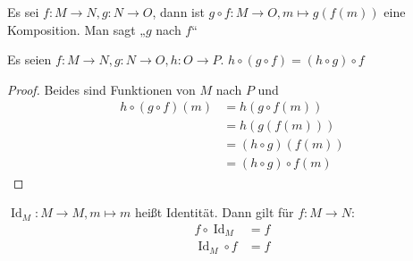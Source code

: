 \begin{definition}
  Es sei $f: M \to N, g: N \to O$, dann ist $g \circ f: M \to O, m \mapsto g(f(m))$ eine Komposition\index[sym]{$\circ$}. Man sagt „$g$ nach $f$“
\end{definition}
\begin{lemma}
  Es seien $f: M \to N, g: N \to O, h: O \to P$. $h \circ (g \circ f) = (h \circ g) \circ f$
\end{lemma}
\begin{proof}
  Beides sind Funktionen von $M$ nach $P$ und
  \begin{align*}
    h \circ (g \circ f) (m) &= h (g \circ f (m)) \\
    \, &= h(g(f(m))) \\
    \, &= (h \circ g)(f(m)) \\
    \, &= (h \circ g) \circ f (m)
  \end{align*}
\end{proof}

\begin{remark}
  $\operatorname{Id}_M: M \to M, m \mapsto m$ heißt Identität. Dann gilt für $f: M \to N$:
  \begin{align*}
    f \circ \operatorname{Id}_M &= f \\
    \operatorname{Id}_M \circ f &= f
  \end{align*}
\end{remark}

